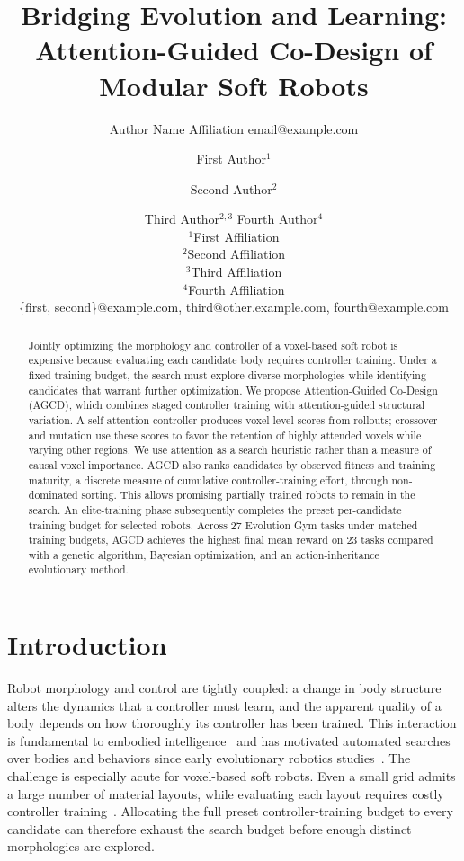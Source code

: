 \documentclass{article}
\title{Bridging Evolution and Learning: Attention-Guided Co-Design of Modular Soft
Robots}
\author{ Author Name \affiliations Affiliation \emails email@example.com }
\author{ First Author$^{1}$ \and Second Author$^{2}$\and Third Author$^{2,3}$\And
Fourth Author$^{4}$\\
\affiliations $^{1}$First Affiliation\\
$^{2}$Second Affiliation\\
$^{3}$Third Affiliation\\
$^{4}$Fourth Affiliation\\
\emails \{first, second\}@example.com, third@other.example.com, fourth@example.com
}
\begin{document}
    \maketitle
    \linenumbers
    \begin{abstract}
        Jointly optimizing the morphology and controller of a voxel-based soft
        robot is expensive because evaluating each candidate body requires
        controller training. Under a fixed training budget, the search must
        explore diverse morphologies while identifying candidates that warrant
        further optimization. We propose Attention-Guided Co-Design (AGCD), which
        combines staged controller training with attention-guided structural
        variation. A self-attention controller produces voxel-level scores from
        rollouts; crossover and mutation use these scores to favor the retention
        of highly attended voxels while varying other regions. We use attention
        as a search heuristic rather than a measure of causal voxel importance.
        AGCD also ranks candidates by observed fitness and training maturity,
        a discrete measure of cumulative controller-training effort, through
        non-dominated sorting. This allows promising partially trained robots
        to remain in the search. An elite-training phase subsequently completes
        the preset per-candidate training budget for selected robots.
        Across 27 Evolution Gym
        tasks under matched training budgets, AGCD achieves the highest final
        mean reward on 23 tasks compared with a genetic algorithm, Bayesian
        optimization, and an action-inheritance evolutionary method.
    \end{abstract}

    \section{Introduction}
    Robot morphology and control are tightly coupled: a change in body structure
    alters the dynamics that a controller must learn, and the apparent quality of
    a body depends on how thoroughly its controller has been trained. This
    interaction is fundamental to embodied intelligence~\cite{liu2025embodied,pfeifer2006morphological}
    and has motivated automated searches over bodies and behaviors since early
    evolutionary robotics studies~\cite{sims1994evolving,lipson2000automatic,bongard2003evolving}.
    The challenge is especially acute for voxel-based soft robots. Even a small
    grid admits a large number of material layouts, while evaluating each layout
    requires costly controller training~\cite{bhatia2021evolution,liu2023rapidly}.
    Allocating the full preset controller-training budget to every candidate
    can therefore exhaust the search budget before enough distinct morphologies
    are explored.
\end{document}
